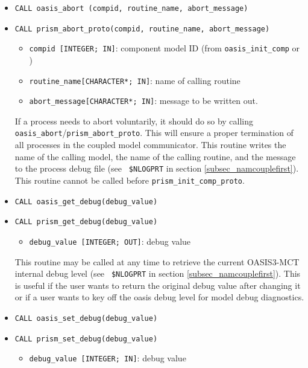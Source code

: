 \begin{itemize}
\item {\tt CALL oasis\_abort       (compid, routine\_name, abort\_message)}
\item {\tt CALL prism\_abort\_proto(compid, routine\_name, abort\_message)}
\begin{itemize}
  \item {\tt compid [INTEGER; IN]}: component model ID (from
{\tt oasis\_init\_comp} or ) 
  \item {\tt routine\_name[CHARACTER*; IN]}: name of calling routine
  \item {\tt abort\_message[CHARACTER*; IN]}: message to be written out.
\end{itemize}

 If a process needs to abort voluntarily, it should do so by
 calling {\tt oasis\_abort}/{\tt prism\_abort\_proto}. This will ensure a proper
 termination of all processes in the coupled model communicator. This
 routine writes the name of the calling model, the name of the
 calling routine, and the message to the process debug file (see {\tt
   \$NLOGPRT} in section \ref{subsec_namcouplefirst}). 
 This routine cannot be called before {\tt prism\_init\_comp\_proto}.

\vspace{0.2cm} 
\item {\tt CALL oasis\_get\_debug(debug\_value)}
\item {\tt CALL prism\_get\_debug(debug\_value)}
\begin{itemize}
\item {\tt debug\_value [INTEGER; OUT]}: debug value
\end{itemize}

This routine may be called at any time to retrieve the current
OASIS3-MCT internal debug level (see {\tt
\$NLOGPRT} in section \ref{subsec_namcouplefirst}).  This is useful
if the user wants to return the original debug value after changing
it or if a user wants to key off the oasis
debug level for model debug diagnostics.

\vspace{0.2cm} 
\item {\tt CALL oasis\_set\_debug(debug\_value)}
\item {\tt CALL prism\_set\_debug(debug\_value)}
\begin{itemize}
\item {\tt debug\_value [INTEGER; IN]}: debug value
\end{itemize}


\end{itemize}
